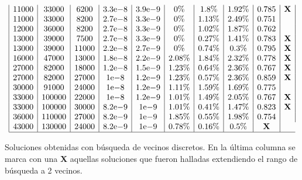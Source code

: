 \documentclass{llncs}
\newcommand{\expnumber}[2]{{#1}\mathrm{e}{#2}}
\begin{document}
\begin{table}[H]
$$\begin{array}{|c|c|c|c|c|c|c|c|c|c|}
		11000 & 33000 & 6200 & \expnumber{3.3}{-8} & \expnumber{3.9}{-9} & 0\% & 1.8\% & 1.92\% & 0.785 & \textbf{X} \\
		11000 & 33000 & 8200 & \expnumber{2.7}{-8} & \expnumber{3.3}{-9}  & 0\% & 1.13\% & 2.49\% & 0 .751&\\
		12000 & 36000 & 8200 & \expnumber{2.7}{-8} & \expnumber{3.3}{-9}  & 0\% & 1.02\% & 1.87\% & 0.762 & \\
		13000 & 39000 & 7500 & \expnumber{2.7}{-8} & \expnumber{3.3}{-9} & 0\% & 0.27\% & 1.41\% & 0.783 & \textbf{X} \\
		13000 & 39000 & 11000 & \expnumber{2.2}{-8} & \expnumber{2.7}{-9} & 0\% & 0.74\% & 0.3\% & 0.795 & \textbf{X} \\
		16000 & 47000 & 13000 & \expnumber{1.8}{-8} & \expnumber{2.2}{-9} & 2.08\% & 1.84\% & 2.32\% & 0.778 & \textbf{X} \\ 
		27000 & 82000 & 18000 & \expnumber{1.2}{-8} & \expnumber{1.5}{-9} & 1.23\% & 0.64\% & 2.36\% & 0.767 & \textbf{X} \\ 
		27000 & 82000 & 27000 & \expnumber{1}{-8} & \expnumber{1.2}{-9} & 1.23\% & 0.57\% & 2.36\% & 0.859 & \textbf{X} \\
		30000 & 91000 & 24000 & \expnumber{1}{-8} & \expnumber{1.2}{-9}  & 1.11\% & 1.59\% & 1.69\% & 0.775 & \\
		33000 & 100000 & 22000 & \expnumber{1}{-8} & \expnumber{1.2}{-9} & 1.01\% & 1.49\% & 2.05\% & 0.767 & \textbf{X} \\
		33000 & 100000 & 30000 & \expnumber{8.2}{-9} & \expnumber{1}{-9} & 1.01\% & 0.41\% & 1.47\% & 0.823 & \textbf{X} \\
		36000 & 110000 & 27000 & \expnumber{8.2}{-9} & \expnumber{1}{-9}  & 1.85\% & 0.55\% & 1.98\% & 0.754 & \\
		43000 & 130000 & 24000 & \expnumber{8.2}{-9} & \expnumber{1}{-9} & 0.78\% & 0.16\% & 0.5\% & \textbf{X} \\
		\hline
		\end{array}
		$$
		\caption{Soluciones obtenidas con búsqueda de vecinos discretos. En la última columna se marca con una \textbf{X} aquellas
		soluciones que fueron halladas extendiendo el rango de búsqueda a 2 vecinos.}
		\label{cuadroSolVecinos}
	\end{table}
	
\end{document}
